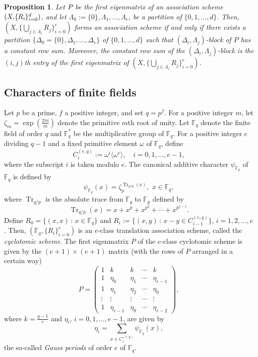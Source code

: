 \documentclass[10pt]{amsart}
\newtheorem{prop}[theo]{Proposition}
\theoremstyle{definition}
\DeclareMathOperator{\Tr}{Tr}
\newcommand*\F{{\mathbb F}}
\newcommand*{\mk}{\mkern -1mu}
\newcommand*{\Mk}{\mkern -2mu}
\begin{document}
\begin{prop}\label{prop:BM}
Let $P\Mk$ be the first eigenmatrix of an association scheme $(X\Mk,\Mk\{\mk R_i\mk \}_{i=0}^d)$, and let $\Lambda_0:=\{0\}, \Lambda_1,\ldots,\Lambda_e$, be a partition of $\{0,1,\ldots,d\}$. Then, $(X,\{\bigcup_{j\in \Lambda_i}R_j\}_{i=0}^e)$ forms an association scheme if and only if there exists a partition $\{\Delta_0=\{0\},\Delta_1,\ldots,\Delta_e\}$ of $\{0,1,\ldots,d\}$ such that $(\Delta_i,\Lambda_j)$-block of $P$ has a constant row sum. Moreover, the constant row sum of the $(\Delta_i,\Lambda_j)$-block is the $(i,j)$th entry of the first eigenmatrix of $(X,\{\bigcup_{j\in \Lambda_i}R_j\}_{i=0}^e)$.
\end{prop}

\subsection{Characters of finite fields}\label{sec:31}
Let $p$ be a prime, $f$ a positive integer, and set $q=p^f$. For a positive integer $m$, let $\zeta_m=\exp(\frac{2\pi i}{m})$ denote the primitive $m$th root of unity. Let $\F_q$ denote the finite field of order $q$ and $\F_q^\ast$ be the multiplicative group of $\F_q$. For a positive integer $e$ dividing $q-1$ and a fixed primitive element $\omega$ of $\F_q$, define
\[
C_i^{(e,q)}:=\omega^i\langle \omega^e\rangle, \quad i=0,1,\ldots,e-1,
\]
where the subscript $i$ is taken modulo $e$. The canonical additive character $\psi_{\F_q}$ of $\F_q$ is defined by
\[
\psi_{\F_q}(x)=\zeta_p^{\Tr_{q/p}(x)}, \, \, x\in \F_q,
\]
where $\Tr_{q/p}$ is the absolute trace from $\F_q$ to $\F_p$ defined by
\[
\Tr_{q/p}(x)=x+x^p+x^{p^2}+\cdots+x^{p^{f-1}}.
\]
Define $R_0=\{(x,x)\,:\,x\in \F_q\}$ and $R_i:=\{(x,y)\,:\,x-y \in C_{i-1}^{(e,q)}\}$, $i=1,2,\ldots,e$. Then, $(\F_{q},\{R_i\}_{i=0}^e)$ is an $e$-class translation association scheme, called the \emph{cyclotomic scheme}. The first eigenmatrix $P$ of the $e$-class cyclotomic scheme is given by the $(e+1)\times (e+1)$ matrix (with the rows of $P$ arranged in a certain way)
\[
P=
\begin{pmatrix}
1 &k & k& \cdots &k \\
1 & \eta_0 & \eta_1&\cdots &\eta_{e-1} \\
1 & \eta_1 & \eta_2&\cdots &\eta_{0} \\
\vdots &\vdots &\vdots & \cdots & \vdots \\
1 & \eta_{e-1} & \eta_0&\cdots &\eta_{e-2}
\end{pmatrix},
\]
where $k=\frac{q-1}{e}$ and $\eta_i$, $i=0,1,\ldots,e-1$, are given by
\[
\eta_i=\sum_{x\in C_i^{(e,q)}}\psi_{\F_q}(x),
\]
the so-called \emph{Gauss periods} of order $e$ of $\F_q$.
\end{document}
